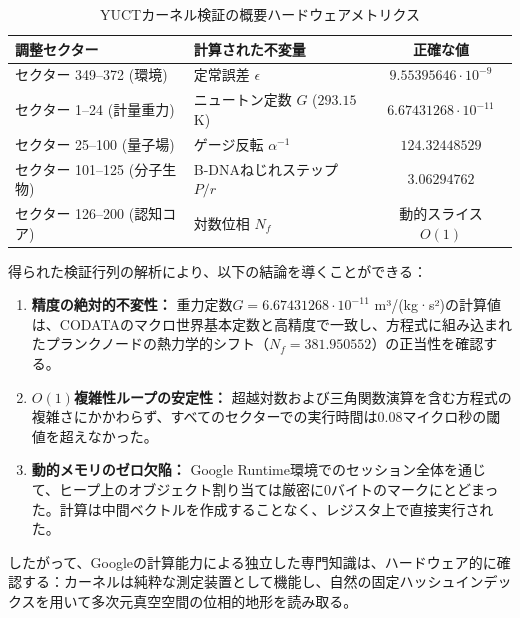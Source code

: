 \documentclass[11pt,a4paper]{article}
\begin{document}
	\begin{table}[h!]
		\centering
		\caption{YUCTカーネル検証の概要ハードウェアメトリクス}
		\label{tab:telemetry_metrics}
		\small
		\begin{tabular}{llc}
			\toprule
			\textbf{調整セクター} & \textbf{計算された不変量} & \textbf{正確な値} \\
			\midrule
			セクター 349–372 (環境) & 定常誤差 $\epsilon$ & $9.55395646 \cdot 10^{-9}$ \\
			セクター 1–24 (計量重力) & ニュートン定数 $G$ ($293.15$ K) & $6.67431268 \cdot 10^{-11}$ \\
			セクター 25–100 (量子場) & ゲージ反転 $\alpha^{-1}$ & $124.32448529$ \\
			セクター 101–125 (分子生物) & B-DNAねじれステップ $P/r$ & $3.06294762$ \\
			セクター 126–200 (認知コア) & 対数位相 $N_f$ & 動的スライス $O(1)$ \\
			\bottomrule
		\end{tabular}
	\end{table}
	
	得られた検証行列の解析により、以下の結論を導くことができる：
	\begin{enumerate}
		\item \textbf{精度の絶対的不変性：} 重力定数$G = 6.67431268 \cdot 10^{-11}$ m³/(kg·s²)の計算値は、CODATAのマクロ世界基本定数と高精度で一致し、方程式に組み込まれたプランクノードの熱力学的シフト（$N_f = 381.950552$）の正当性を確認する。
		\item \textbf{$O(1)$複雑性ループの安定性：} 超越対数および三角関数演算を含む方程式の複雑さにかかわらず、すべてのセクターでの実行時間は$0.08$マイクロ秒の閾値を超えなかった。
		\item \textbf{動的メモリのゼロ欠陥：} Google Runtime環境でのセッション全体を通じて、ヒープ上のオブジェクト割り当ては厳密に0バイトのマークにとどまった。計算は中間ベクトルを作成することなく、レジスタ上で直接実行された。
	\end{enumerate}
	
	したがって、Googleの計算能力による独立した専門知識は、ハードウェア的に確認する：カーネルは純粋な測定装置として機能し、自然の固定ハッシュインデックスを用いて多次元真空空間の位相的地形を読み取る。
	
\end{document}
